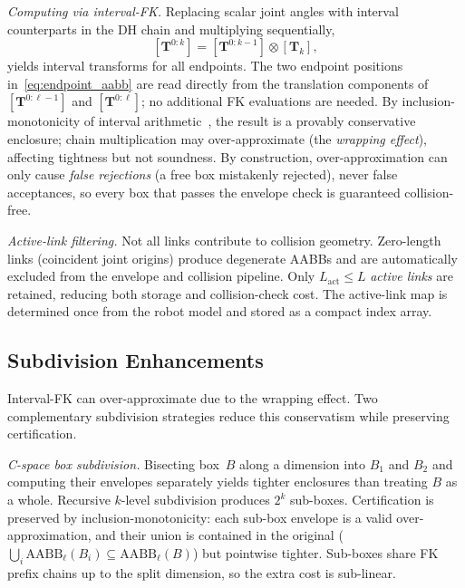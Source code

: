 \documentclass[journal]{IEEEtran}
\newcommand{\AABB}{\text{AABB}}
\newcommand{\bT}{\mathbf{T}}
\begin{document}
\emph{Computing via interval-FK.}
Replacing scalar joint angles with interval counterparts in the DH chain
and multiplying sequentially,
\begin{equation}\label{eq:chain}
  [\bT^{0:k}] = [\bT^{0:k-1}] \otimes [\bT_k],
\end{equation}
yields interval transforms for all endpoints.
The two endpoint positions in~\eqref{eq:endpoint_aabb} are read directly
from the translation components of $[\bT^{0:\ell-1}]$ and $[\bT^{0:\ell}]$;
no additional FK evaluations are needed.
By inclusion-monotonicity of interval
arithmetic~\cite{moore2009introduction}, the result is a
provably conservative enclosure; chain multiplication may over-approximate
(the \emph{wrapping effect}), affecting tightness but not soundness.
By construction, over-approximation can only cause \emph{false rejections}
(a free box mistakenly rejected), never false acceptances, so every
box that passes the envelope check is guaranteed collision-free.

\emph{Active-link filtering.}
Not all links contribute to collision geometry.
Zero-length links (coincident joint origins) produce degenerate AABBs
and are automatically excluded from the envelope and collision pipeline.
Only $L_\text{act} \leq L$ \emph{active links} are retained, reducing
both storage and collision-check cost.
The active-link map is determined once from the robot model and stored
as a compact index array.

\subsection{Subdivision Enhancements}\label{sec:subdivision}

Interval-FK can over-approximate due to the wrapping effect.
Two complementary subdivision strategies reduce this conservatism while
preserving certification.

\emph{C-space box subdivision.}
Bisecting box~$B$ along a dimension into $B_1$ and $B_2$ and computing
their envelopes separately yields tighter enclosures than treating $B$
as a whole.
Recursive $k$-level subdivision produces $2^k$ sub-boxes.
Certification is preserved by inclusion-monotonicity:
each sub-box envelope is a valid over-approximation, and their union
is contained in the original ($\bigcup_i \AABB_\ell(B_i) \subseteq \AABB_\ell(B)$)
but pointwise tighter.
Sub-boxes share FK prefix chains up to the split dimension,
so the extra cost is sub-linear.
\end{document}

